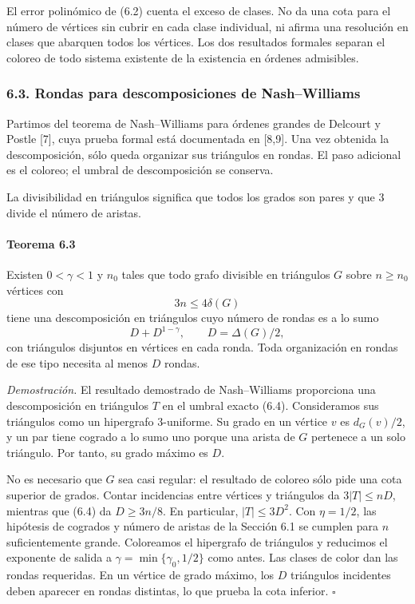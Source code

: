 \documentclass[spanish,11pt,a4paper]{article}
\begin{document}
El error polinómico de (6.2) cuenta el exceso de clases. No da una cota para el número de vértices sin cubrir en cada clase individual, ni afirma una resolución en clases que abarquen todos los vértices. Los dos resultados formales separan el coloreo de todo sistema existente de la existencia en órdenes admisibles.


\subsubsection{6.3. Rondas para descomposiciones de Nash--Williams}\label{rondas-para-descomposiciones-de-nashwilliams}

Partimos del teorema de Nash--Williams para órdenes grandes de Delcourt y Postle {[}7{]}, cuya prueba formal está documentada en {[}8,9{]}. Una vez obtenida la descomposición, sólo queda organizar sus triángulos en rondas. El paso adicional es el coloreo; el umbral de descomposición se conserva.

La divisibilidad en triángulos significa que todos los grados son pares y que \(3\) divide el número de aristas.

\par
\begin{samepage}
\paragraph{Teorema 6.3}\label{teorema-6.3}

Existen \(0<\gamma<1\) y \(n_0\) tales que todo grafo divisible en triángulos \(G\) sobre \(n\ge n_0\) vértices con \[3n\le4\delta(G)
\tag{6.4}\] tiene una descomposición en triángulos cuyo número de rondas es a lo sumo \[D+D^{1-\gamma},\qquad D=\Delta(G)/2,
\tag{6.5}\] con triángulos disjuntos en vértices en cada ronda. Toda organización en rondas de ese tipo necesita al menos \(D\) rondas.

\end{samepage}
\emph{Demostración.} El resultado demostrado de Nash--Williams proporciona una descomposición en triángulos \(T\) en el umbral exacto (6.4). Consideramos sus triángulos como un hipergrafo \(3\)-uniforme. Su grado en un vértice \(v\) es \(d_G(v)/2\), y un par tiene cogrado a lo sumo uno porque una arista de \(G\) pertenece a un solo triángulo. Por tanto, su grado máximo es \(D\).

No es necesario que \(G\) sea casi regular: el resultado de coloreo sólo pide una cota superior de grados. Contar incidencias entre vértices y triángulos da \(3|T|\le nD\), mientras que (6.4) da \(D\ge3n/8\). En particular, \(|T|\le3D^2\). Con \(\eta=1/2\), las hipótesis de cogrados y número de aristas de la Sección 6.1 se cumplen para \(n\) suficientemente grande. Coloreamos el hipergrafo de triángulos y reducimos el exponente de salida a \(\gamma=\min\{\gamma_0,1/2\}\) como antes. Las clases de color dan las rondas requeridas. En un vértice de grado máximo, los \(D\) triángulos incidentes deben aparecer en rondas distintas, lo que prueba la cota inferior. \(\square\)
\end{document}
